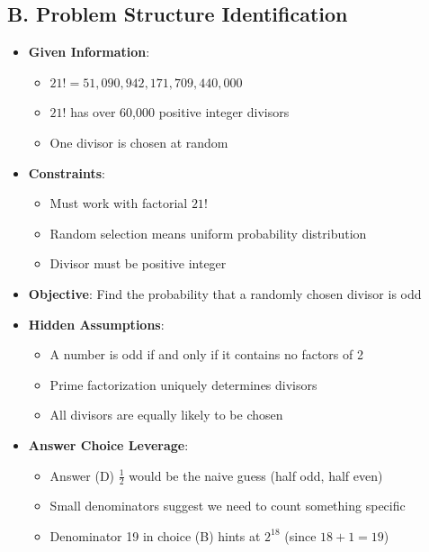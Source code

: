 \documentclass[]{article}
\begin{document}
\begin{problemconfigbox}
\subsection*{B. Problem Structure Identification}
\begin{itemize}[leftmargin=*]
    \item \textbf{Given Information}: 
    \begin{itemize}
        \item $21! = 51,090,942,171,709,440,000$
        \item $21!$ has over 60,000 positive integer divisors
        \item One divisor is chosen at random
    \end{itemize}
    \item \textbf{Constraints}: 
    \begin{itemize}
        \item Must work with factorial $21!$
        \item Random selection means uniform probability distribution
        \item Divisor must be positive integer
    \end{itemize}
    \item \textbf{Objective}: Find the probability that a randomly chosen divisor is odd
    \item \textbf{Hidden Assumptions}: 
    \begin{itemize}
        \item A number is odd if and only if it contains no factors of 2
        \item Prime factorization uniquely determines divisors
        \item All divisors are equally likely to be chosen
    \end{itemize}
    \item \textbf{Answer Choice Leverage}: 
    \begin{itemize}
        \item Answer (D) $\frac{1}{2}$ would be the naive guess (half odd, half even)
        \item Small denominators suggest we need to count something specific
        \item Denominator 19 in choice (B) hints at $2^{18}$ (since $18 + 1 = 19$)
    \end{itemize}
\end{itemize}


\end{problemconfigbox}
\end{document}
